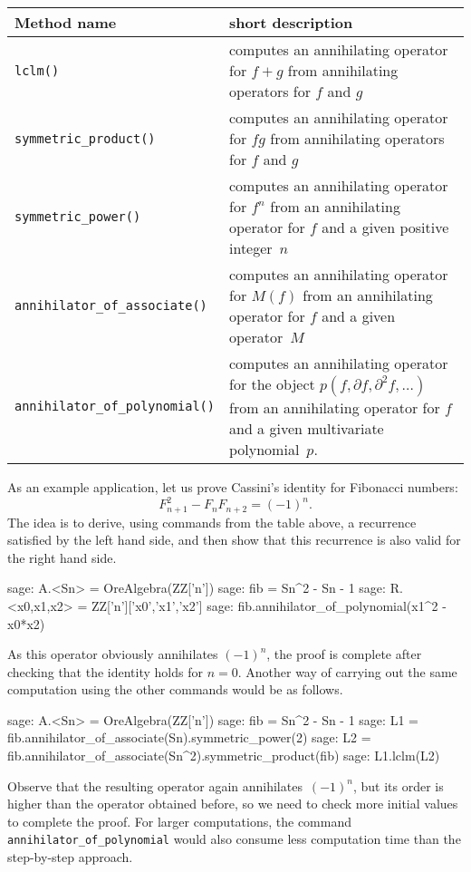\documentclass{llncs}
\begin{document}
\begin{center}
\begin{tabular}{|l|p{.55\hsize}|}
\hline
Method name & short description \\\hline
\verb|lclm()| & computes an annihilating operator for $f+g$ from annihilating operators for $f$ and $g$ \\
\verb|symmetric_product()| & computes an annihilating operator for $fg$ from annihilating operators for $f$ and $g$ \\
\verb|symmetric_power()| & computes an annihilating operator for $f^n$ from an annihilating operator for $f$ and a given positive integer~$n$\\ 
\verb|annihilator_of_associate()| & computes an annihilating operator for $M(f)$ from an annihilating operator for $f$ and a given operator~$M$\\ 
\verb|annihilator_of_polynomial()| & computes an annihilating operator for the object $p(f,\partial f,\partial^2 f,\dots)$ from an annihilating operator for $f$ and a given multivariate polynomial~$p$. \\
\hline
\end{tabular}
\end{center}

As an example application, let us prove Cassini's identity for Fibonacci
numbers: 
\[
  F_{n+1}^2 - F_nF_{n+2}=(-1)^n.
\]
The idea is to derive, using commands from the table above, a recurrence
satisfied by the left hand side, and then show that this recurrence is also
valid for the right hand side.

\begin{sageexample}
  sage: A.<Sn> = OreAlgebra(ZZ['n'])
  sage: fib = Sn^2 - Sn - 1
  sage: R.<x0,x1,x2> = ZZ['n']['x0','x1','x2']
  sage: fib.annihilator_of_polynomial(x1^2 - x0*x2) 
\end{sageexample}

As this operator obviously annihilates $(-1)^n$, the proof is complete after
checking that the identity holds for $n=0$. Another way of carrying out the
same computation using the other commands would be as follows.

\begin{sageexample}
  sage: A.<Sn> = OreAlgebra(ZZ['n'])
  sage: fib = Sn^2 - Sn - 1
  sage: L1 = fib.annihilator_of_associate(Sn).symmetric_power(2)
  sage: L2 = fib.annihilator_of_associate(Sn^2).symmetric_product(fib)
  sage: L1.lclm(L2)
\end{sageexample}

Observe that the resulting operator again annihilates~$(-1)^n$, but its order is
higher than the operator obtained before, so we need to check more initial
values to complete the proof. For larger computations, the command
\verb|annihilator_of_polynomial| would also consume less computation time than
the step-by-step approach.
\end{document}
